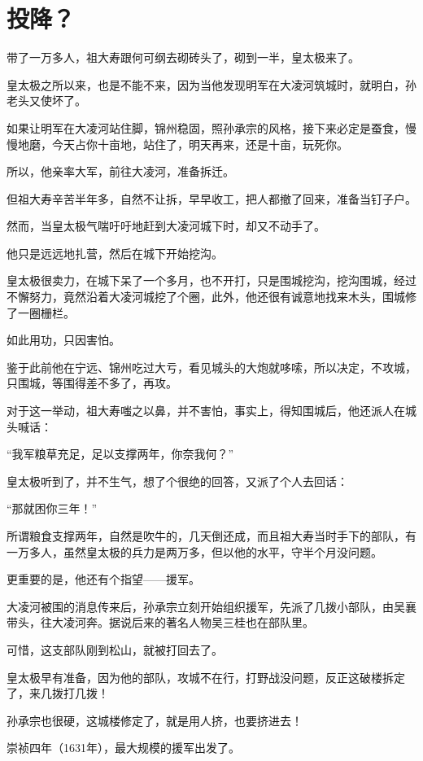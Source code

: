 \section{投降？}
\ifnum{}
	\begin{multicols}{\theparacolNo}
		\fi
		带了一万多人，祖大寿跟何可纲去砌砖头了，砌到一半，皇太极来了。

		皇太极之所以来，也是不能不来，因为当他发现明军在大凌河筑城时，就明白，孙老头又使坏了。

		如果让明军在大凌河站住脚，锦州稳固，照孙承宗的风格，接下来必定是蚕食，慢慢地磨，今天占你十亩地，站住了，明天再来，还是十亩，玩死你。

		所以，他亲率大军，前往大凌河，准备拆迁。

		但祖大寿辛苦半年多，自然不让拆，早早收工，把人都撤了回来，准备当钉子户。

		然而，当皇太极气喘吁吁地赶到大凌河城下时，却又不动手了。

		他只是远远地扎营，然后在城下开始挖沟。

		皇太极很卖力，在城下呆了一个多月，也不开打，只是围城挖沟，挖沟围城，经过不懈努力，竟然沿着大凌河城挖了个圈，此外，他还很有诚意地找来木头，围城修了一圈栅栏。

		如此用功，只因害怕。

		鉴于此前他在宁远、锦州吃过大亏，看见城头的大炮就哆嗦，所以决定，不攻城，只围城，等围得差不多了，再攻。

		对于这一举动，祖大寿嗤之以鼻，并不害怕，事实上，得知围城后，他还派人在城头喊话：

		“我军粮草充足，足以支撑两年，你奈我何？”

		皇太极听到了，并不生气，想了个很绝的回答，又派了个人去回话：

		“那就困你三年！”

		所谓粮食支撑两年，自然是吹牛的，几天倒还成，而且祖大寿当时手下的部队，有一万多人，虽然皇太极的兵力是两万多，但以他的水平，守半个月没问题。

		更重要的是，他还有个指望——援军。

		大凌河被围的消息传来后，孙承宗立刻开始组织援军，先派了几拨小部队，由吴襄带头，往大凌河奔。据说后来的著名人物吴三桂也在部队里。

		可惜，这支部队刚到松山，就被打回去了。

		皇太极早有准备，因为他的部队，攻城不在行，打野战没问题，反正这破楼拆定了，来几拨打几拨！

		孙承宗也很硬，这城楼修定了，就是用人挤，也要挤进去！

		崇祯四年（1631年），最大规模的援军出发了。


\end{multicols}
